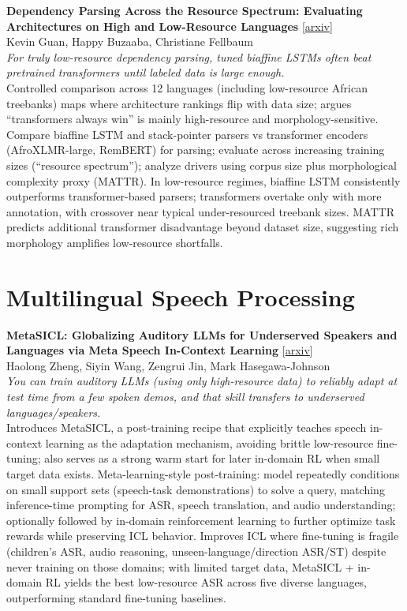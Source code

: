 \documentclass[12pt,letterpaper]{article}
\begin{document}
\medskip

{\small\textbf{Dependency Parsing Across the Resource Spectrum: Evaluating Architectures on High and Low-Resource Languages}} {\scriptsize[\href{https://arxiv.org/abs/2605.02608}{arxiv}]}\\
{\scriptsize Kevin Guan, Happy Buzaaba, Christiane Fellbaum}\\

{\small\textit{For truly low-resource dependency parsing, tuned biaffine LSTMs often beat pretrained transformers until labeled data is large enough.}}\\[1pt]
{\footnotesize Controlled comparison across 12 languages (including low-resource African treebanks) maps where architecture rankings flip with data size; argues ``transformers always win'' is mainly high-resource and morphology-sensitive. Compare biaffine LSTM and stack-pointer parsers vs transformer encoders (AfroXLMR-large, RemBERT) for parsing; evaluate across increasing training sizes (``resource spectrum''); analyze drivers using corpus size plus morphological complexity proxy (MATTR). In low-resource regimes, biaffine LSTM consistently outperforms transformer-based parsers; transformers overtake only with more annotation, with crossover near typical under-resourced treebank sizes. MATTR predicts additional transformer disadvantage beyond dataset size, suggesting rich morphology amplifies low-resource shortfalls.}

\medskip


\section*{Multilingual Speech Processing}

{\small\textbf{MetaSICL: Globalizing Auditory LLMs for Underserved Speakers and Languages via Meta Speech In-Context Learning}} {\scriptsize[\href{https://arxiv.org/abs/2601.18904}{arxiv}]}\\
{\scriptsize Haolong Zheng, Siyin Wang, Zengrui Jin, Mark Hasegawa-Johnson}\\

{\small\textit{You can train auditory LLMs (using only high-resource data) to reliably adapt at test time from a few spoken demos, and that skill transfers to underserved languages/speakers.}}\\[1pt]
{\footnotesize Introduces MetaSICL, a post-training recipe that explicitly teaches speech in-context learning as the adaptation mechanism, avoiding brittle low-resource fine-tuning; also serves as a strong warm start for later in-domain RL when small target data exists. Meta-learning-style post-training: model repeatedly conditions on small support sets (speech-task demonstrations) to solve a query, matching inference-time prompting for ASR, speech translation, and audio understanding; optionally followed by in-domain reinforcement learning to further optimize task rewards while preserving ICL behavior. Improves ICL where fine-tuning is fragile (children's ASR, audio reasoning, unseen-language/direction ASR/ST) despite never training on those domains; with limited target data, MetaSICL + in-domain RL yields the best low-resource ASR across five diverse languages, outperforming standard fine-tuning baselines.}
\end{document}
